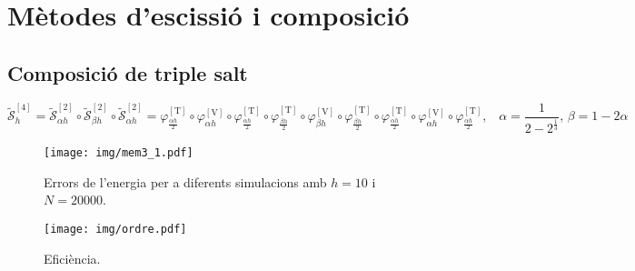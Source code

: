 \documentclass[10pt,a4paper,catalan,twoside]{article}
\begin{document}
\section{Mètodes d'escissió i composició}
\subsection{Composició de triple salt}
\begin{equation}
  \mathcal{\tilde{S}}_h^{\left[4\right]} = \mathcal{\tilde{S}}_{\alpha h}^{\left[2\right]}\circ\mathcal{\tilde{S}}_{\beta h}^{\left[2\right]}\circ \mathcal{\tilde{S}}_{\alpha h}^{\left[2\right]}=\varphi_{\frac{\alpha h}{2}}^{\left[\text{T}\right]}\circ \varphi_{\alpha h}^{\left[\text{V}\right]}\circ\varphi_{\frac{\alpha h}{2}}^{\left[\text{T}\right]}\circ \varphi_{\frac{\beta h}{2}}^{\left[\text{T}\right]}\circ \varphi_{\beta h}^{\left[\text{V}\right]}\circ\varphi_{\frac{\beta h}{2}}^{\left[\text{T}\right]} \circ \varphi_{\frac{\alpha h}{2}}^{\left[\text{T}\right]}\circ \varphi_{\alpha h}^{\left[\text{V}\right]}\circ\varphi_{\frac{\alpha h}{2}}^{\left[\text{T}\right]}\text{,}\quad \alpha=\frac{1}{2-2^{\frac{1}{3}}}\text{, }\beta=1-2\alpha
\end{equation}
\begin{figure}[!ht]
  \begin{center}
    \texttt{[image: img/mem3\_1.pdf]}
    \caption{Errors de l'energia per a diferents simulacions amb $h=10$ i $N = 20000$.}
    \label{fig:err3}
  \end{center}
\end{figure}

\clearpage
\begin{figure}[!ht]
  \begin{center}
    \texttt{[image: img/ordre.pdf]}
    \caption{Eficiència.}
    \label{fig:efi}
  \end{center}
\end{figure}
\end{document}
